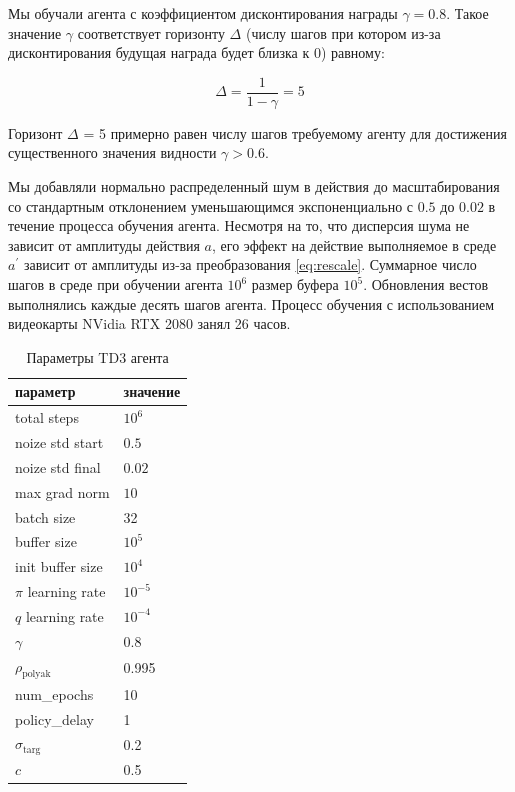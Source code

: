 Мы обучали агента с коэффициентом дисконтирования награды $\gamma = 0.8$. Такое значение $\gamma$ соответствует горизонту $\Delta$ (числу шагов при котором из-за дисконтирования будущая награда будет близка к $0$) равному: 

\begin{equation}
    \Delta = \frac{1}{1 - \gamma} = 5
\end{equation}

Горизонт $\Delta$ = 5 примерно равен числу шагов требуемому агенту для достижения существенного значения видности $\gamma > 0.6$. 

Мы добавляли нормально распределенный шум в действия до масштабирования со стандартным отклонением уменьшающимся экспоненциально с $0.5$ до $0.02$ в течение процесса обучения агента. Несмотря на то, что дисперсия шума не зависит от амплитуды действия $a$, его эффект на действие выполняемое в среде $a^{\prime}$ зависит от амплитуды из-за преобразования \eqref{eq:rescale}. Суммарное число шагов в среде при обучении агента $10^6$ размер буфера $10^5$. Обновления вестов выполнялись каждые десять шагов агента. Процесс обучения с использованием видеокарты NVidia RTX 2080 занял 26 часов. 

\begin{table} [htbp]
    \centering
    \begin{threeparttable}%
        \caption{Параметры TD3 агента}\label{tab:td3_params}%
        \begin{tabular}{| p{5cm} || p{5cm} |}
            \hline
            \hline
            параметр & значение \\
            \hline
            total steps & $10^6$ \\
            noize std start & $0.5$ \\
            noize std final & $0.02$ \\
            max grad norm & $10$ \\
            batch size & 32 \\
            buffer size & $10^5$ \\
            init buffer size & $10^4$ \\
            $\pi$ learning rate & $10^{-5}$ \\
            $q$ learning rate & $10^{-4}$ \\
            $\gamma$ & 0.8 \\
            $\rho_{\mathrm{polyak}}$ & 0.995 \\
            num\_epochs & 10  \\
            policy\_delay & 1 \\
            $\sigma_{\mathrm{targ}}$ & 0.2 \\
            $c$ & 0.5 \\
            \hline
            \hline
        \end{tabular}
    \end{threeparttable}
\end{table}

